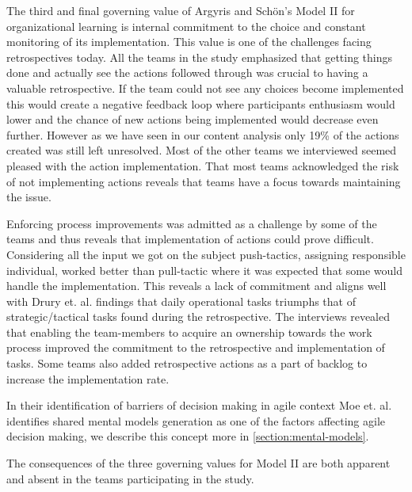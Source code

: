 The third and final governing value of Argyris and Schön's Model II for organizational learning is internal commitment to the choice and constant monitoring of its implementation. This value is one of the challenges facing retrospectives today. All the teams in the study emphasized that getting things done and actually see the actions followed through was crucial to having a valuable retrospective. If the team could not see any choices become implemented this would create a negative feedback loop where participants enthusiasm would lower and the chance of new actions being implemented would decrease even further. However as we have seen in our content analysis only 19\% of the actions created was still left unresolved. Most of the other teams we interviewed seemed pleased with the action implementation. That most teams acknowledged the risk of not implementing actions reveals that teams have a focus towards maintaining the issue. 

Enforcing process improvements was admitted as a challenge by some of the teams and thus reveals that implementation of actions could prove difficult. Considering all the input we got on the subject push-tactics, assigning responsible individual, worked better than pull-tactic where it was expected that some would handle the implementation. This reveals a lack of commitment and aligns well with Drury et. al. \cite{Drury2012} findings that daily operational tasks triumphs that of strategic/tactical tasks found during the retrospective. The interviews revealed that enabling the team-members to acquire an ownership towards the work process improved the commitment to the retrospective and implementation of tasks. Some teams also added retrospective actions as a part of backlog to increase the implementation rate. 

In their identification of barriers of decision making in agile context Moe et. al. identifies shared mental models generation as one of the factors affecting agile decision making, we describe this concept more in \autoref{section:mental-models}. 


The consequences of the three governing values for Model II are both apparent and absent in the teams participating in the study.

